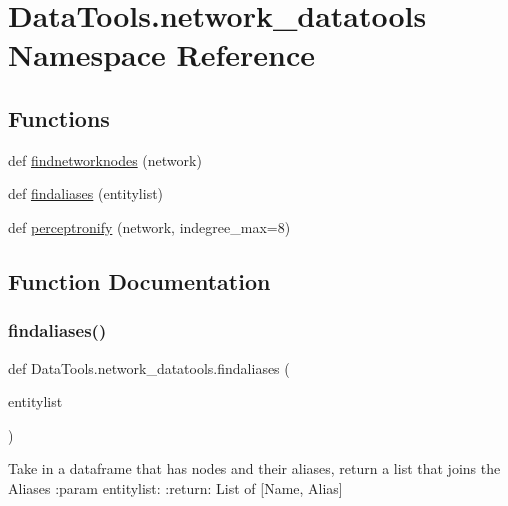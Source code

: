\hypertarget{namespace_data_tools_1_1network__datatools}{}\section{Data\+Tools.\+network\+\_\+datatools Namespace Reference}
\label{namespace_data_tools_1_1network__datatools}
\subsection*{Functions}
\begin{DoxyCompactItemize}
\item 
def \mbox{\hyperlink{namespace_data_tools_1_1network__datatools_a287e9a5a04e363791a6edd7788c4ab6a}{findnetworknodes}} (network)
\item 
def \mbox{\hyperlink{namespace_data_tools_1_1network__datatools_a034bb7ad9bd12784116a3653e97ed31a}{findaliases}} (entitylist)
\item 
def \mbox{\hyperlink{namespace_data_tools_1_1network__datatools_a3454d576ee67753afd1470118377dab5}{perceptronify}} (network, indegree\+\_\+max=8)
\end{DoxyCompactItemize}


\subsection{Function Documentation}
\mbox{\label{namespace_data_tools_1_1network__datatools_a034bb7ad9bd12784116a3653e97ed31a}} 
\subsubsection{\texorpdfstring{findaliases()}{findaliases()}}
{\footnotesize\ttfamily def Data\+Tools.\+network\+\_\+datatools.\+findaliases (\begin{DoxyParamCaption}\item[{}]{entitylist }\end{DoxyParamCaption})}

\begin{DoxyVerb}    Take in a dataframe that has nodes and their aliases, return a list that joins the Aliases
:param entitylist:
:return: List of [Name, Alias]
\end{DoxyVerb}
 \mbox{\label{namespace_data_tools_1_1network__datatools_a287e9a5a04e363791a6edd7788c4ab6a}} 

